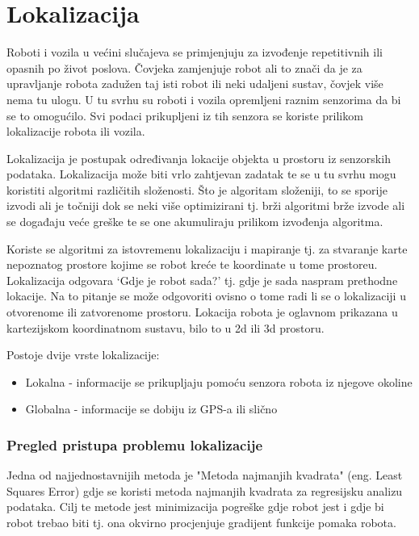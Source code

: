 \section{Lokalizacija}

Roboti i vozila u većini slučajeva se primjenjuju za izvođenje repetitivnih ili opasnih po život poslova. Čovjeka zamjenjuje robot ali to znači da je za upravljanje robota zadužen taj isti robot ili neki udaljeni sustav, čovjek više nema tu ulogu. U tu svrhu su roboti i vozila opremljeni raznim senzorima da bi se to omogućilo. Svi podaci prikupljeni iz tih senzora se koriste prilikom lokalizacije robota ili vozila.

Lokalizacija je postupak određivanja lokacije objekta u prostoru iz senzorskih podataka. Lokalizacija može biti vrlo zahtjevan zadatak te se u tu svrhu mogu koristiti algoritmi različitih složenosti. Što je algoritam složeniji, to se sporije izvodi ali je točniji dok se neki više optimizirani tj. brži algoritmi brže izvode ali se događaju veće greške te se one akumuliraju prilikom izvođenja algoritma.

Koriste se algoritmi za istovremenu lokalizaciju i mapiranje \cite{Simultaneous_localization_and_mapping} tj. za stvaranje karte nepoznatog prostore kojime se robot kreće te koordinate u tome prostoreu. Lokalizacija odgovara `Gdje je robot sada?' tj. gdje je sada naspram prethodne lokacije. Na to pitanje se može odgovoriti ovisno o tome radi li se o lokalizaciji u otvorenome ili zatvorenome prostoru. Lokacija robota je oglavnom prikazana u kartezijskom koordinatnom sustavu, bilo to u 2d ili 3d prostoru.

Postoje dvije vrste lokalizacije:

\begin{itemize}
  \item Lokalna - informacije se prikupljaju pomoću senzora robota iz njegove okoline
  \item Globalna - informacije se dobiju iz GPS-a ili slično
\end{itemize}

\newpage
\subsubsection{Pregled pristupa problemu lokalizacije}

Jedna od najjednostavnijih metoda je "Metoda najmanjih kvadrata" (eng. Least Squares Error) gdje se koristi metoda najmanjih kvadrata za regresijsku analizu podataka. Cilj te metode jest minimizacija pogreške gdje robot jest i gdje bi robot trebao biti tj. ona okvirno procjenjuje gradijent funkcije pomaka robota.

